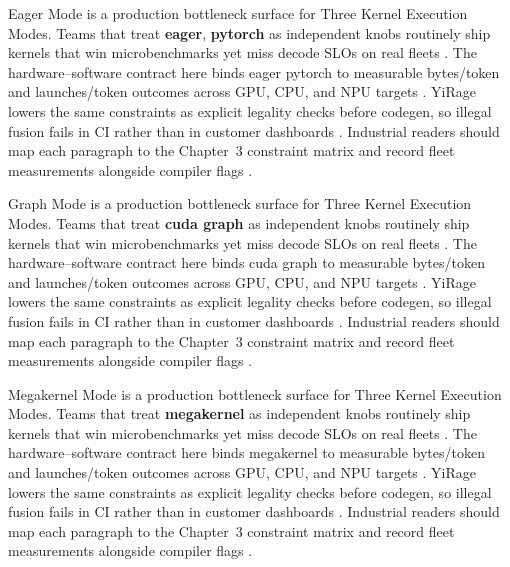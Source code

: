 Eager Mode is a production bottleneck surface for Three Kernel Execution Modes. Teams that treat \textbf{eager}, \textbf{pytorch} as independent knobs routinely ship kernels that win microbenchmarks yet miss decode SLOs on real fleets \citep{semianalysis2024tma,dlbook}. The hardware--software contract here binds eager pytorch to measurable bytes/token and launches/token outcomes across GPU, CPU, and NPU targets \citep{amd2024xdna,dao2022flashattention}. YiRage lowers the same constraints as explicit legality checks before codegen, so illegal fusion fails in CI rather than in customer dashboards \citep{amd2024aie,kwon2023vllm}. Industrial readers should map each paragraph to the Chapter~3 constraint matrix and record fleet measurements alongside compiler flags \citep{dlbook,nvidia2024cudagraphs}.

Graph Mode is a production bottleneck surface for Three Kernel Execution Modes. Teams that treat \textbf{cuda graph} as independent knobs routinely ship kernels that win microbenchmarks yet miss decode SLOs on real fleets \citep{amd2024xdna,dao2022flashattention}. The hardware--software contract here binds cuda graph to measurable bytes/token and launches/token outcomes across GPU, CPU, and NPU targets \citep{amd2024aie,kwon2023vllm}. YiRage lowers the same constraints as explicit legality checks before codegen, so illegal fusion fails in CI rather than in customer dashboards \citep{dlbook,nvidia2024cudagraphs}. Industrial readers should map each paragraph to the Chapter~3 constraint matrix and record fleet measurements alongside compiler flags \citep{dao2022flashattention,liu2024deepseekv3}.

Megakernel Mode is a production bottleneck surface for Three Kernel Execution Modes. Teams that treat \textbf{megakernel} as independent knobs routinely ship kernels that win microbenchmarks yet miss decode SLOs on real fleets \citep{amd2024aie,kwon2023vllm}. The hardware--software contract here binds megakernel to measurable bytes/token and launches/token outcomes across GPU, CPU, and NPU targets \citep{dlbook,nvidia2024cudagraphs}. YiRage lowers the same constraints as explicit legality checks before codegen, so illegal fusion fails in CI rather than in customer dashboards \citep{dao2022flashattention,liu2024deepseekv3}. Industrial readers should map each paragraph to the Chapter~3 constraint matrix and record fleet measurements alongside compiler flags \citep{kwon2023vllm,patel2025llminference}.

